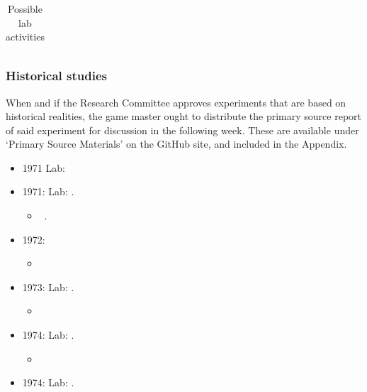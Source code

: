 \begin{refsection}
\begin{longtable}[!t]{ | P{4cm} | P{2.5cm} |   P{3cm} |  P{5cm} |}
\caption{Possible lab activities}
\label{table: labs}
\end{longtable}

\subsubsection{Historical studies}
\label{historicalstudies}

When and if the Research Committee approves experiments that are based on historical realities, the game master ought to distribute the primary source report of said experiment for discussion in the following week. These are available under ‘Primary Source Materials’ on the GitHub site, and included in the Appendix.

\begin{itemize}
\item 1971 Lab:  

\item 1971: Lab: .

\begin{itemize}
\item ~\citep{Shepard:1971uf}.

\end{itemize}

\item 1972: 

\begin{itemize}
\item ~\citep{Siegelman:1972vv}

\end{itemize}

\item 1973: Lab: .

\begin{itemize}
\item ~\citep{Rosenhan:1973uq}

\end{itemize}

\item 1974: Lab: .

\begin{itemize}
\item ~\citep{Haney:1973wf}

\end{itemize}

\item 1974: Lab: .


\end{itemize}
\end{refsection}
